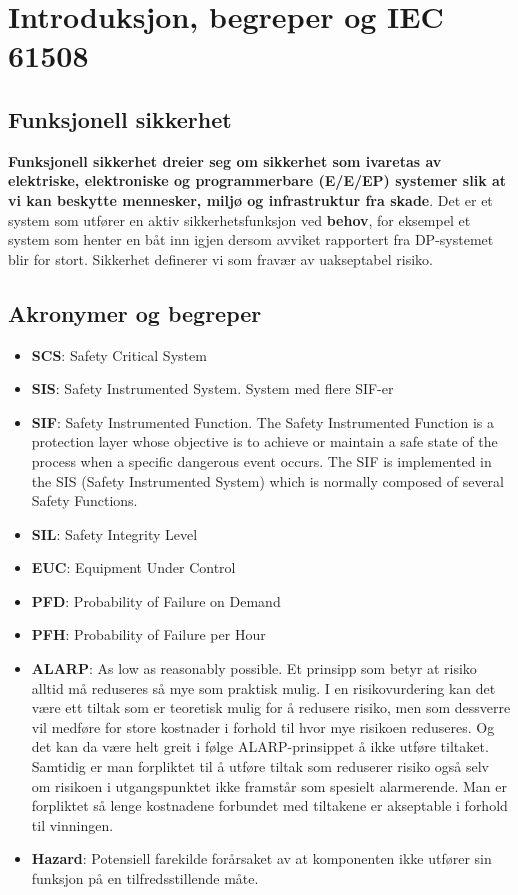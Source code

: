 \section{Introduksjon, begreper og IEC 61508}
\label{sec:intro}

\subsection{Funksjonell sikkerhet}

\textbf{Funksjonell sikkerhet dreier seg om sikkerhet som ivaretas av elektriske, elektroniske og programmerbare (E/E/EP) systemer slik at vi kan beskytte mennesker, miljø og infrastruktur fra skade}. Det er et system som utfører en aktiv sikkerhetsfunksjon ved \textbf{behov}, for eksempel et system som henter en båt inn igjen dersom avviket rapportert fra DP-systemet blir for stort. Sikkerhet definerer vi som fravær av uakseptabel risiko.


\subsection{Akronymer og begreper}

\begin{itemize}
    \item \textbf{SCS}: Safety Critical System
    \item \textbf{SIS}: Safety Instrumented System. System med flere SIF-er
    \item \textbf{SIF}: Safety Instrumented Function. The Safety Instrumented Function is a protection layer whose objective is to achieve or maintain a safe state of the process when a specific dangerous event occurs. The SIF is implemented in the SIS (Safety Instrumented System) which is normally composed of several Safety Functions.
    \item \textbf{SIL}: Safety Integrity Level
    \item \textbf{EUC}: Equipment Under Control
    \item \textbf{PFD}: Probability of Failure on Demand
    \item \textbf{PFH}: Probability of Failure per Hour
    \item \textbf{ALARP}: As low as reasonably possible. Et prinsipp som betyr at risiko alltid må reduseres så mye som praktisk mulig. I en risikovurdering kan det være ett tiltak som er teoretisk mulig for å redusere risiko, men som dessverre vil medføre for store kostnader i forhold til hvor mye risikoen reduseres. Og det kan da være helt greit i følge ALARP-prinsippet å ikke utføre tiltaket. Samtidig er man forpliktet til å utføre tiltak som reduserer risiko også selv om risikoen i utgangspunktet ikke framstår som spesielt alarmerende. Man er forpliktet så lenge kostnadene forbundet med tiltakene er akseptable i forhold til vinningen.
    \item \textbf{Hazard}: Potensiell farekilde forårsaket av at komponenten ikke utfører sin funksjon på en tilfredsstillende måte.
\end{itemize}


